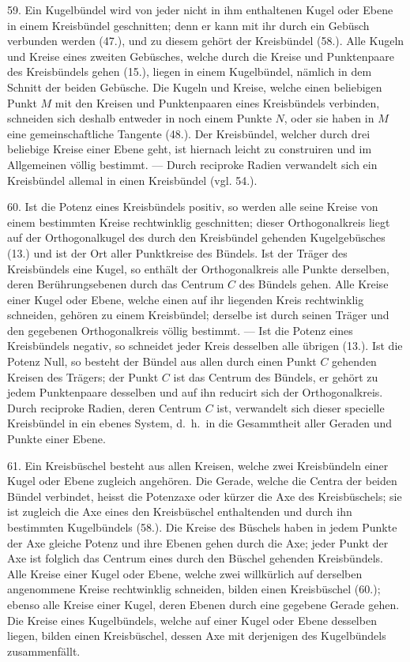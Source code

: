 59. Ein Kugelb\"undel wird von jeder nicht in ihm enthaltenen
Kugel oder Ebene in einem Kreisb\"undel geschnitten;
denn er kann mit ihr durch ein Geb\"usch verbunden
werden (47.), und zu diesem geh\"ort der Kreisb\"undel (58.).
Alle Kugeln und Kreise eines zweiten Geb\"usches, welche
durch die Kreise und Punktenpaare des Kreisb\"undels gehen
(15.), liegen in einem Kugelb\"undel, n\"amlich in dem Schnitt
der beiden Geb\"usche. Die Kugeln und Kreise, welche einen
beliebigen Punkt $M$ mit den Kreisen und Punktenpaaren
eines Kreisb\"undels verbinden, schneiden sich deshalb entweder
in noch einem Punkte $N$, oder sie haben in $M$ eine
gemeinschaftliche Tangente (48.). Der Kreisb\"undel, welcher
durch drei beliebige Kreise einer Ebene geht, ist hiernach
leicht zu construiren und im Allgemeinen v\"ollig bestimmt. --- Durch
reciproke Radien verwandelt sich ein Kreisb\"undel
allemal in einen Kreisb\"undel (vgl. 54.).


60. Ist die Potenz eines Kreisb\"undels positiv, so werden
alle seine Kreise von einem bestimmten Kreise rechtwinklig
geschnitten; dieser {\glqq}Orthogonalkreis{\grqq} liegt auf der Orthogonalkugel
des durch den Kreisb\"undel gehenden Kugelgeb\"usches
(13.) und ist der Ort aller Punktkreise des B\"undels. Ist der
Tr\"ager des Kreisb\"undels eine Kugel, so enth\"alt der Orthogonalkreis
alle Punkte derselben, deren Ber\"uhrungsebenen
durch das Centrum $C$ des B\"undels gehen. Alle Kreise einer
Kugel oder Ebene, welche einen auf ihr liegenden Kreis rechtwinklig
schneiden, geh\"oren zu einem Kreisb\"undel; derselbe ist
durch seinen Tr\"ager und den gegebenen Orthogonalkreis
v\"ollig bestimmt. --- Ist die Potenz eines Kreisb\"undels negativ,
so schneidet jeder Kreis desselben alle \"ubrigen (13.).
Ist die Potenz Null, so besteht der B\"undel aus allen durch
einen Punkt $C$ gehenden Kreisen des Tr\"agers; der Punkt $C$
ist das Centrum des B\"undels, er geh\"ort zu jedem Punktenpaare
desselben und auf ihn reducirt sich der Orthogonalkreis.
Durch reciproke Radien, deren Centrum $C$ ist, verwandelt
sich dieser specielle Kreisb\"undel in ein ebenes System,
d.~h.\ in die Gesammtheit aller Geraden und Punkte
einer Ebene.

61. Ein {\glqq}Kreisb\"uschel{\grqq} besteht aus allen Kreisen,
welche zwei Kreis\-b\"un\-deln einer Kugel oder Ebene zugleich
angeh\"oren. Die Gerade, welche die Centra der beiden B\"undel
verbindet, heisst die {\glqq}Potenzaxe{\grqq} oder k\"urzer die {\glqq}Axe{\grqq}
des Kreisb\"uschels; sie ist zugleich die Axe eines den Kreisb\"uschel
enthaltenden und durch ihn bestimmten Kugelb\"undels
(58.). Die Kreise des B\"uschels haben in jedem Punkte
der Axe gleiche Potenz und ihre Ebenen gehen durch die
Axe; jeder Punkt der Axe ist folglich das Centrum eines
durch den B\"uschel gehenden Kreisb\"undels. Alle Kreise einer
Kugel oder Ebene, welche zwei willk\"urlich auf derselben angenommene
Kreise rechtwinklig schneiden, bilden einen
Kreisb\"uschel (60.); ebenso alle Kreise einer Kugel, deren
Ebenen durch eine gegebene Gerade gehen. Die Kreise eines
Kugelb\"undels, welche auf einer Kugel oder Ebene desselben
liegen, bilden einen Kreisb\"uschel, dessen Axe mit derjenigen
des Kugelb\"undels zusammenf\"allt.

